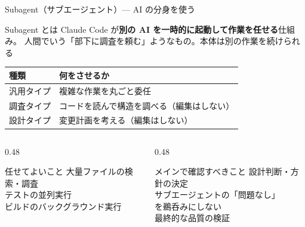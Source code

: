 \documentclass[aspectratio=169, 14pt]{beamer}
\begin{document}
\begin{frame}{Subagent（サブエージェント）— AI の分身を使う}
  \begin{block}{Subagent とは}
    {\small Claude Code が\textbf{別の AI を一時的に起動して作業を任せる}仕組み。
    人間でいう「部下に調査を頼む」ようなもの。本体は別の作業を続けられる}
  \end{block}

  \begin{table}
    \centering\scriptsize
    \begin{tabular}{lp{60mm}}
      \hline
      \textbf{種類} & \textbf{何をさせるか} \\
      \hline
      汎用タイプ    & 複雑な作業を丸ごと委任 \\
      調査タイプ    & コードを読んで構造を調べる（編集はしない） \\
      設計タイプ    & 変更計画を考える（編集はしない） \\
      \hline
    \end{tabular}
  \end{table}

  \begin{columns}[T]
    \begin{column}{0.48\textwidth}
      \begin{exampleblock}{任せてよいこと}
        {\scriptsize
        大量ファイルの検索・調査 \\
        テストの並列実行 \\
        ビルドのバックグラウンド実行
        }
      \end{exampleblock}
    \end{column}
    \begin{column}{0.48\textwidth}
      \begin{alertblock}{メインで確認すべきこと}
        {\scriptsize
        設計判断・方針の決定 \\
        サブエージェントの「問題なし」\\を鵜呑みにしない \\
        最終的な品質の検証
        }
      \end{alertblock}
    \end{column}
  \end{columns}
\end{frame}
\end{document}

